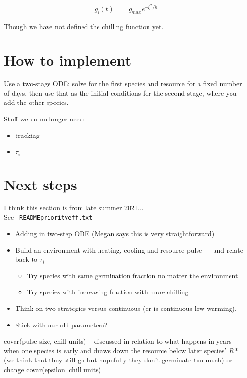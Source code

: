 \documentclass[11pt,letter]{article}
\begin{document}
\begin{align}
g_i(t) & = g_{max}e^{-\xi^2/h}
\end{align}

Though we have not defined the chilling function yet. 



\section{How to implement} 

Use a two-stage ODE: solve for the first species and resource for a fixed number of days, then use that as the initial conditions for the second stage, where you add the other species.


Stuff we do no longer need:\\
\begin{itemize}
\item tracking
\item $\tau_i$
\end{itemize}

\section{Next steps}
I think this section is from late summer 2021...\\

See \verb|_READMEpriorityeff.txt| 

\begin{itemize}
\item Adding in two-step ODE (Megan says this is very straightforward)
\item  Build an environment with heating, cooling and resource pulse — and relate back to $\tau_i$
\begin{itemize}
\item Try species with same germination fraction no matter the environment
\item Try species with increasing fraction with more chilling 
\end{itemize}
\item Think on two strategies versus continuous (or is continuous low warming).
\item Stick with our old parameters? 
\end{itemize}

covar(pulse size, chill units) -- discussed in relation to what happens in years when one species is early and draws down the resource below later species' $R*$ (we think that they still go but hopefully they don't germinate too much) or change covar(epsilon, chill units)\\
\end{document}
